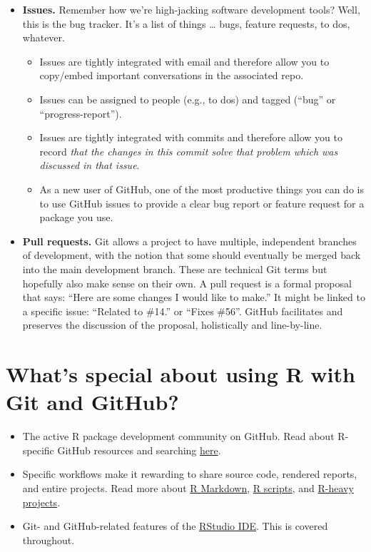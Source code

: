 \documentclass[
]{book}
\providecommand{\tightlist}{%
  \setlength{\itemsep}{0pt}\setlength{\parskip}{0pt}}
\begin{document}
\begin{itemize}
\tightlist
\item
  \textbf{Issues.} Remember how we're high-jacking software development tools? Well, this is the bug tracker. It's a list of things \ldots{} bugs, feature requests, to dos, whatever.

  \begin{itemize}
  \tightlist
  \item
    Issues are tightly integrated with email and therefore allow you to copy/embed important conversations in the associated repo.
  \item
    Issues can be assigned to people (e.g., to dos) and tagged (``bug'' or ``progress-report'').
  \item
    Issues are tightly integrated with commits and therefore allow you to record \emph{that the changes in this commit solve that problem which was discussed in that issue}.
  \item
    As a new user of GitHub, one of the most productive things you can do is to use GitHub issues to provide a clear bug report or feature request for a package you use.
  \end{itemize}
\item
  \textbf{Pull requests.} Git allows a project to have multiple, independent branches of development, with the notion that some should eventually be merged back into the main development branch. These are technical Git terms but hopefully also make sense on their own. A pull request is a formal proposal that says: ``Here are some changes I would like to make.'' It might be linked to a specific issue: ``Related to \#14.'' or ``Fixes \#56''. GitHub facilitates and preserves the discussion of the proposal, holistically and line-by-line.
\end{itemize}

\section{What's special about using R with Git and GitHub?}\label{whats-special-about-using-r-with-git-and-github}

\begin{itemize}
\tightlist
\item
  The active R package development community on GitHub. Read about R-specific GitHub resources and searching \hyperref[search]{here}.
\item
  Specific workflows make it rewarding to share source code, rendered reports, and entire projects. Read more about \hyperref[rmd-test-drive]{R Markdown}, \hyperref[r-test-drive]{R scripts}, and \hyperref[repo-browsability]{R-heavy projects}.
\item
  Git- and GitHub-related features of the \href{https://www.rstudio.com/products/rstudio-desktop/}{RStudio IDE}. This is covered throughout.
\end{itemize}
\end{document}
